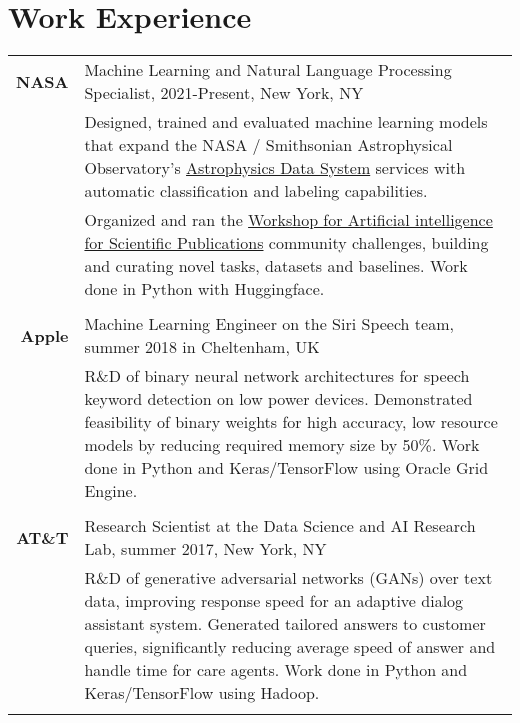 \documentclass[a4paper,10pt]{article}
\begin{document}
\section{Work Experience}
    \vspace{0.2cm}
    \begin{tabular}{r|p{160mm}}
        \textbf{NASA} &  Machine Learning and Natural Language Processing Specialist, 2021-Present, New York, NY\\ 
        & \small{Designed, trained and evaluated machine learning models that expand the NASA / Smithsonian Astrophysical Observatory's \href{https://scixplorer.org/}{Astrophysics Data System} services with automatic classification and labeling capabilities.}\\
        & \small{Organized and ran the \href{https://ui.adsabs.harvard.edu/WIESP/}{Workshop for Artificial intelligence for Scientific Publications} community challenges, building and curating novel tasks, datasets and baselines. Work done in Python with Huggingface.}\\
        \multicolumn{2}{c}{} \vspace{-1.5mm} \\

        \textbf{Apple} & Machine Learning Engineer on the Siri Speech team, summer 2018 in Cheltenham, UK\\
        & \small{R\&D of binary neural network architectures for speech keyword detection on low power devices. Demonstrated feasibility of binary weights for high accuracy, low resource models by reducing required memory size by 50\%. Work done in Python and Keras/TensorFlow using Oracle Grid Engine.}\\
        \multicolumn{2}{c}{} \vspace{-1.5mm} \\

        \textbf{AT\&T} & Research Scientist at the Data Science and AI Research Lab, summer 2017, New York, NY\\
        & \small{R\&D of generative adversarial networks (GANs) over text data, improving response speed for an adaptive dialog assistant system. Generated tailored answers to customer queries, significantly reducing average speed of answer and handle time for care agents. Work done in Python and Keras/TensorFlow using Hadoop.}\\
        \multicolumn{2}{c}{} \vspace{-1.5mm} \\
        

\end{tabular}
\end{document}
